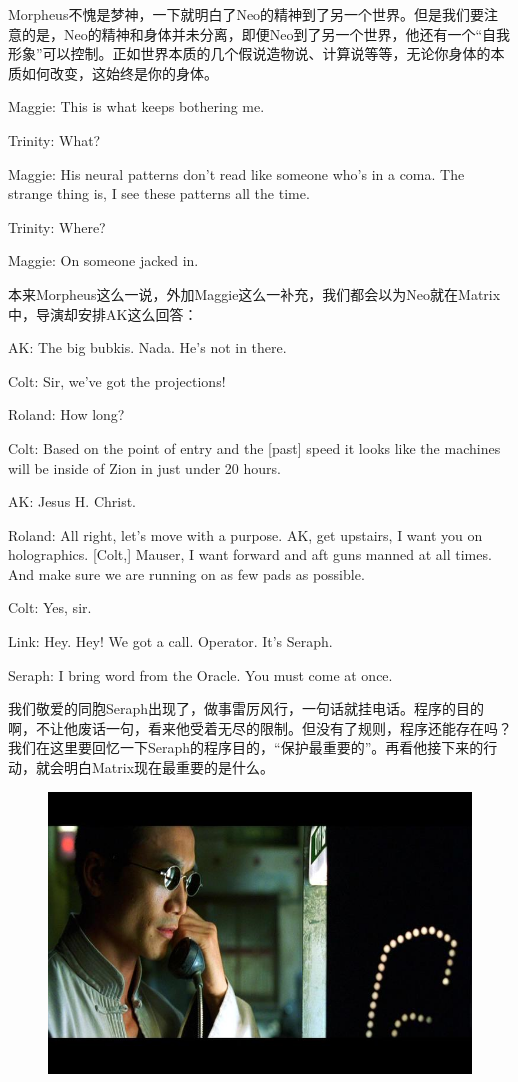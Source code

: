 \documentclass[UTF8]{ctexart}
\newenvironment{myquote}{\color{green} \setlength{\leftskip}{6em} \setlength{\rightskip}{4em} \setlength{\parindent}{-2em}}{\par}
\begin{document}
Morpheus不愧是梦神，一下就明白了Neo的精神到了另一个世界。但是我们要注意的是，Neo的精神和身体并未分离，即便Neo到了另一个世界，他还有一个“自我形象”可以控制。正如世界本质的几个假说造物说、计算说等等，无论你身体的本质如何改变，这始终是你的身体。

\begin{myquote}
Maggie: This is what keeps bothering me.

Trinity: What?

Maggie: His neural patterns don't read like someone who's in a coma. The strange thing is, I see these patterns all the time.

Trinity: Where?

Maggie: On someone jacked in.
\end{myquote}

本来Morpheus这么一说，外加Maggie这么一补充，我们都会以为Neo就在Matrix中，导演却安排AK这么回答：

\begin{myquote}
AK: The big bubkis. Nada. He's not in there.

Colt: Sir, we've got the projections!

Roland: How long?

Colt: Based on the point of entry and the [past] speed it looks like the machines will be inside of Zion in just under 20 hours.

AK: Jesus H. Christ.

Roland: All right, let's move with a purpose. AK, get upstairs, I want you on holographics. [Colt,] Mauser, I want forward and aft guns manned at all times. And make sure we are running on as few pads as possible.

Colt: Yes, sir.

Link: Hey. Hey! We got a call. Operator. It's Seraph.

Seraph: I bring word from the Oracle. You must come at once.
\end{myquote}

我们敬爱的同胞Seraph出现了，做事雷厉风行，一句话就挂电话。程序的目的啊，不让他废话一句，看来他受着无尽的限制。但没有了规则，程序还能存在吗？我们在这里要回忆一下Seraph的程序目的，“保护最重要的”。再看他接下来的行动，就会明白Matrix现在最重要的是什么。

\begin{figure}[htb]
\centering
\includegraphics[width=0.5\linewidth]{fig/1f716227f5c3fe03918f9d12.jpg}
\end{figure}
\end{document}
